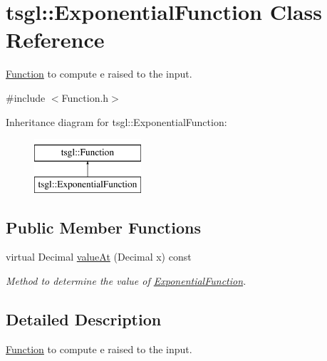 \hypertarget{classtsgl_1_1_exponential_function}{\section{tsgl\-:\-:\-Exponential\-Function \-Class \-Reference}
\label{classtsgl_1_1_exponential_function}
}


\hyperlink{classtsgl_1_1_function}{\-Function} to compute e raised to the input.  




{\ttfamily \#include $<$\-Function.\-h$>$}

\-Inheritance diagram for tsgl\-:\-:\-Exponential\-Function\-:\begin{figure}[H]
\begin{center}
\leavevmode
\includegraphics[height=2.000000cm]{classtsgl_1_1_exponential_function}
\end{center}
\end{figure}
\subsection*{\-Public \-Member \-Functions}
\begin{DoxyCompactItemize}
\item 
virtual \-Decimal \hyperlink{classtsgl_1_1_exponential_function_a059eae7c56a61c73b4c545b6c0e309d9}{value\-At} (\-Decimal x) const 
\begin{DoxyCompactList}\small\item\em \-Method to determine the value of \hyperlink{classtsgl_1_1_exponential_function}{\-Exponential\-Function}. \end{DoxyCompactList}\end{DoxyCompactItemize}


\subsection{\-Detailed \-Description}
\hyperlink{classtsgl_1_1_function}{\-Function} to compute e raised to the input. 

